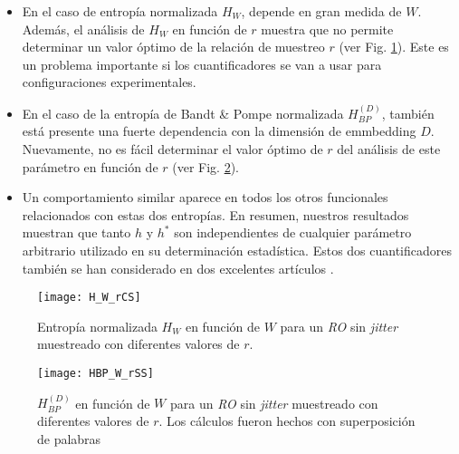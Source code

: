 \begin{itemize}
	\item En el caso de entropía normalizada $H_{W}$, depende en gran medida de $W$.
	Además, el análisis de $H_{W}$ en función de $r$ muestra que no permite determinar un valor óptimo de la relación de muestreo $r$ (ver Fig. \ref{fig:H_W_rCS}).
	Este es un problema importante si los cuantificadores se van a usar para configuraciones experimentales.
	\item En el caso de la entropía de Bandt \& Pompe normalizada $H^{(D)}_{BP}$, también está presente una fuerte dependencia con la dimensión de emmbedding $D$.
	Nuevamente, no es fácil determinar el valor óptimo de $r$ del análisis de este parámetro en función de $r$ (ver Fig. \ref{fig:HBP_W_rSS}).
	\item Un comportamiento similar aparece en todos los otros funcionales relacionados con estas dos entropías.
	En resumen, nuestros resultados muestran que tanto $h$ y $h^*$ son independientes de cualquier parámetro arbitrario utilizado en su determinación estadística.
	Estos dos cuantificadores también se han considerado en dos excelentes artículos \cite{Amigo2006, Ebeling2001}.
\end{itemize}

%
\begin{figure}
\centering
\texttt{[image: H\_W\_rCS]}
\caption{Entropía normalizada $H_W$ en función de $W$ para un \emph{RO} sin \textit{jitter} muestreado con diferentes valores de $r$.}
\label{fig:H_W_rCS}
\end{figure}
%
\begin{figure}
\centering
\texttt{[image: HBP\_W\_rSS]}
\caption{$H^{(D)}_{BP}$ en función de  $W$ para un \emph{RO} sin \textit{jitter} muestreado con diferentes valores de $r$. Los cálculos fueron hechos con superposición de palabras}
\label{fig:HBP_W_rSS}
\end{figure}

